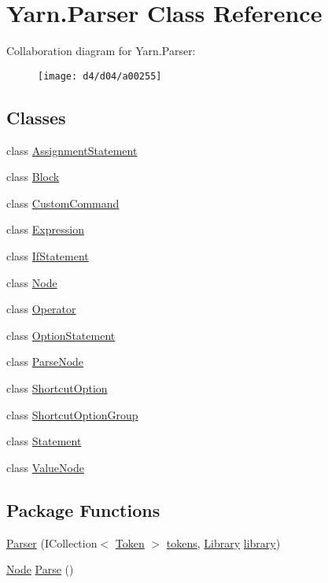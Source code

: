 \hypertarget{a00064}{\section{Yarn.\-Parser Class Reference}
\label{a00064}
}


Collaboration diagram for Yarn.\-Parser\-:
\nopagebreak
\begin{figure}[H]
\begin{center}
\leavevmode
\texttt{[image: d4/d04/a00255]}
\end{center}
\end{figure}
\subsection*{Classes}
\begin{DoxyCompactItemize}
\item 
class \hyperlink{a00019}{Assignment\-Statement}
\item 
class \hyperlink{a00022}{Block}
\item 
class \hyperlink{a00032}{Custom\-Command}
\item 
class \hyperlink{a00040}{Expression}
\item 
class \hyperlink{a00043}{If\-Statement}
\item 
class \hyperlink{a00054}{Node}
\item 
class \hyperlink{a00058}{Operator}
\item 
class \hyperlink{a00061}{Option\-Statement}
\item 
class \hyperlink{a00063}{Parse\-Node}
\item 
class \hyperlink{a00070}{Shortcut\-Option}
\item 
class \hyperlink{a00071}{Shortcut\-Option\-Group}
\item 
class \hyperlink{a00076}{Statement}
\item 
class \hyperlink{a00087}{Value\-Node}
\end{DoxyCompactItemize}
\subsection*{Package Functions}
\begin{DoxyCompactItemize}
\item 
\hyperlink{a00064_acd2714b911fb5e7c38f0e07a9dc1af58}{Parser} (I\-Collection$<$ \hyperlink{a00079}{Token} $>$ \hyperlink{a00064_a1a4de646937057988b59d2ff8035eae3}{tokens}, \hyperlink{a00049}{Library} \hyperlink{a00064_a1313951b09177a1c83b6cf035139197a}{library})
\item 
\hyperlink{a00054}{Node} \hyperlink{a00064_a811cc7226f4f4a2f3440cdb67ad14468}{Parse} ()
\end{DoxyCompactItemize}
